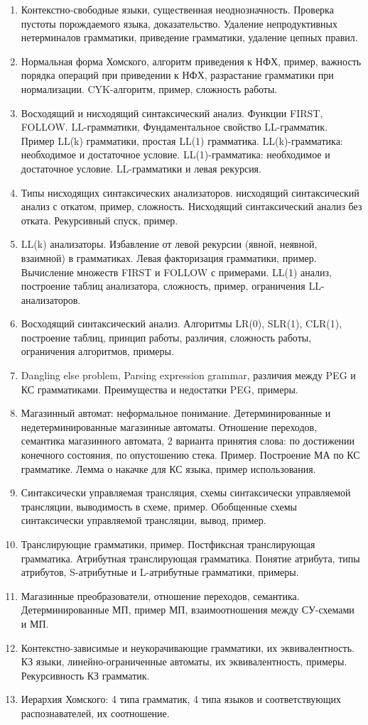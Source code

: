\documentclass[12pt]{article}
\newcommand{\litem}[1]{\item #1 }%
\begin{document}
\begin{enumerate}
  \litem {Контекстно-свободные языки, существенная неоднозначность. Проверка пустоты порождаемого языка, доказательство. Удаление непродуктивных нетерминалов грамматики, приведение грамматики, удаление цепных правил. }
  \litem {Нормальная форма Хомского, алгоритм приведения к НФХ, пример, важность порядка операций при приведении к НФХ, разрастание грамматики при нормализации. CYK-алгоритм, пример, сложность работы. }
  \litem {Восходящий и нисходящий синтаксический анализ. Функции FIRST, FOLLOW. LL-грамматики, Фундаментальное свойство LL-грамматик. Пример LL(k) грамматики, простая LL(1) грамматика. LL(k)-грамматика: необходимое и достаточное условие. LL(1)-грамматика: необходимое и достаточное условие. LL-грамматики и левая рекурсия.}
  \litem {Типы нисходящих синтаксических анализаторов. нисходящий синтаксический анализ с откатом, пример, сложность. Нисходящий синтаксический анализ без отката. Рекурсивный спуск, пример. }
  \litem {LL(k) анализаторы. Избавление от левой рекурсии (явной, неявной, взаимной) в грамматиках. Левая факторизация грамматики, пример. Вычисление множеств FIRST и FOLLOW с примерами. LL(1) анализ, построение таблиц анализатора, сложность, пример, ограничения LL-анализаторов. }
  \litem {Восходящий синтаксический анализ. Алгоритмы LR(0), SLR(1), CLR(1), построение таблиц, принцип работы, различия, сложность работы, ограничения алгоритмов, примеры.}
  \litem {Dangling else problem, Parsing expression grammar, различия между PEG и КС грамматиками. Преимущества и недостатки PEG, примеры. }
  \litem {Магазинный автомат: неформальное понимание. Детерминированные и недетерминированные магазинные автоматы. Отношение переходов, семантика магазинного автомата, 2 варианта принятия слова: по достижении конечного состояния, по опустошению стека. Пример. Построение МА по КС грамматике. Лемма о накачке для КС языка, пример использования. }
  \litem {Синтаксически управляемая трансляция, схемы синтаксически управляемой трансляции, выводимость в схеме, пример. Обобщенные схемы синтаксически управляемой трансляции, вывод, пример. }
  \litem {Транслирующие грамматики, пример. Постфиксная транслирующая грамматика. Атрибутная транслирующая грамматика. Понятие атрибута, типы атрибутов, S-атрибутные и L-атрибутные грамматики, примеры. }
  \litem {Магазинные преобразователи, отношение переходов, семантика. Детерминированные МП, пример МП, взаимоотношения между СУ-схемами и МП.}
  \litem {Контекстно-зависимые и неукорачивающие грамматики, их эквивалентность. КЗ языки, линейно-ограниченные автоматы, их эквивалентность, примеры. Рекурсивность КЗ грамматик. }
  \litem {Иерархия Хомского: 4 типа грамматик, 4 типа языков и соответствующих распознавателей, их соотношение.}
\end{enumerate}
\end{document}
